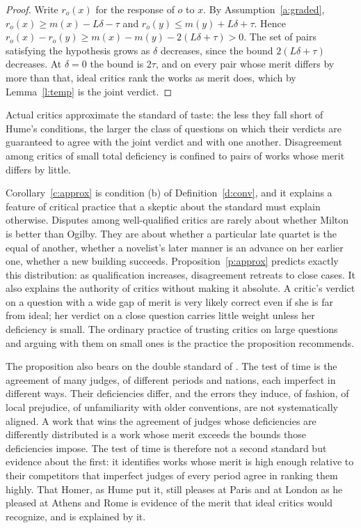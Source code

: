 \documentclass{situationist-preprint}
\begin{document}
\begin{proof}
Write $r_o(x)$ for the response of $o$ to $x$. By Assumption~\ref{a:graded}, $r_o(x)\ge m(x)-L\delta-\tau$ and $r_o(y)\le m(y)+L\delta+\tau$. Hence $r_o(x)-r_o(y)\ge m(x)-m(y)-2(L\delta+\tau)>0$. The set of pairs satisfying the hypothesis grows as $\delta$ decreases, since the bound $2(L\delta+\tau)$ decreases. At $\delta=0$ the bound is $2\tau$, and on every pair whose merit differs by more than that, ideal critics rank the works as merit does, which by Lemma~\ref{l:temp} is the joint verdict.
\end{proof}

\begin{corollary}[Approximation]\label{c:approx}
Actual critics approximate the standard of taste: the less they fall short of Hume's conditions, the larger the class of questions on which their verdicts are guaranteed to agree with the joint verdict and with one another. Disagreement among critics of small total deficiency is confined to pairs of works whose merit differs by little.
\end{corollary}

Corollary~\ref{c:approx} is condition (b) of Definition~\ref{d:conv}, and it explains a feature of critical practice that a skeptic about the standard must explain otherwise. Disputes among well-qualified critics are rarely about whether Milton is better than Ogilby. They are about whether a particular late quartet is the equal of another, whether a novelist's later manner is an advance on her earlier one, whether a new building succeeds. Proposition~\ref{p:approx} predicts exactly this distribution: as qualification increases, disagreement retreats to close cases. It also explains the authority of critics without making it absolute. A critic's verdict on a question with a wide gap of merit is very likely correct even if she is far from ideal; her verdict on a close question carries little weight unless her deficiency is small. The ordinary practice of trusting critics on large questions and arguing with them on small ones is the practice the proposition recommends.

The proposition also bears on the double standard of \citet{Shelley1994}. The test of time is the agreement of many judges, of different periods and nations, each imperfect in different ways. Their deficiencies differ, and the errors they induce, of fashion, of local prejudice, of unfamiliarity with older conventions, are not systematically aligned. A work that wins the agreement of judges whose deficiencies are differently distributed is a work whose merit exceeds the bounds those deficiencies impose. The test of time is therefore not a second standard but evidence about the first: it identifies works whose merit is high enough relative to their competitors that imperfect judges of every period agree in ranking them highly. That Homer, as Hume put it, still pleases at Paris and at London as he pleased at Athens and Rome is evidence of the merit that ideal critics would recognize, and is explained by it.
\end{document}
